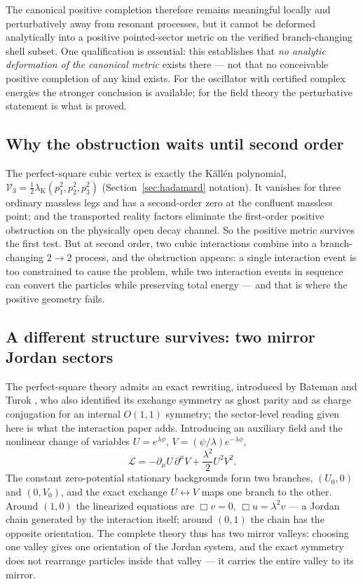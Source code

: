 \documentclass[11pt]{article}
\theoremstyle{remark}
\begin{document}
The canonical positive completion therefore remains meaningful locally
and perturbatively away from resonant processes, but it cannot
be deformed analytically into a positive pointed-sector metric on the
verified branch-changing shell subset.  One qualification is essential:
this establishes that \emph{no analytic
deformation of the canonical metric} exists there --- not that no
conceivable positive completion of any kind exists.  For the oscillator
with certified complex energies the stronger conclusion is available;
for the field theory the perturbative statement is what is proved.

\subsection{Why the obstruction waits until second order}

The perfect-square cubic vertex is exactly the K\"all\'en polynomial,
$\mathcal V_3=\tfrac12\lambda_{\mathrm K}(p_1^2,p_2^2,p_3^2)$
(Section~\ref{sec:hadamard} notation).  It vanishes for three ordinary
massless legs and has a second-order zero at the confluent massless
point; and the transported reality factors eliminate the first-order
positive obstruction on the physically open decay channel.  So the
positive metric survives the first test.  But at second order, two
cubic interactions combine into a branch-changing $2\to2$ process, and
the obstruction appears: a single interaction event is too constrained
to cause the problem, while two interaction events in sequence can
convert the particles while preserving total energy --- and that is
where the positive geometry fails.

\subsection{A different structure survives: two mirror Jordan sectors}

The perfect-square theory admits an exact rewriting, introduced by
Bateman and Turok \cite{BT2026}, who also identified its exchange
symmetry as ghost parity and as charge conjugation for an internal
$O(1,1)$ symmetry; the sector-level reading given here is what the
interaction paper adds.  Introducing an
auxiliary field and the nonlinear change of variables
$U=e^{\lambda\phi}$, $V=(\psi/\lambda)e^{-\lambda\phi}$,
\begin{equation}
\mathcal L=-\partial_\mu U\,\partial^\mu V
+\frac{\lambda^2}{2}U^2V^2 .
\end{equation}
The constant zero-potential stationary backgrounds form two branches,
$(U_0,0)$ and $(0,V_0)$, and the exact exchange $U\leftrightarrow V$
maps one branch to the other.  Around $(1,0)$ the linearized equations
are $\Box v=0$, $\Box u=\lambda^2v$ --- a Jordan chain generated by the
interaction itself; around $(0,1)$ the chain has the opposite
orientation.  The complete theory thus has two mirror valleys: choosing
one valley gives one orientation of the Jordan system, and the exact
symmetry does not rearrange particles inside that valley --- it carries
the entire valley to its mirror.
\end{document}
